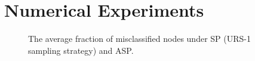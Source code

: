 \appendix
\section{Numerical Experiments}

\begin{figure}[t]
  \begin{center}
 \label{fig:p1}
    \caption{The average fraction of misclassified nodes under SP (URS-1 sampling strategy) and ASP.}
    \label{fig:numerical}
  \end{center}
\end{figure}


